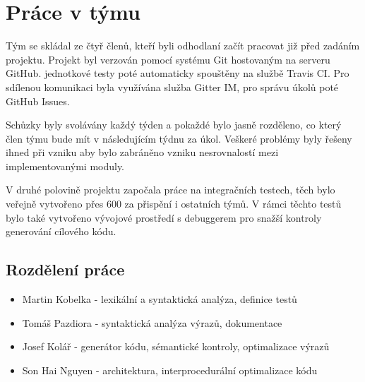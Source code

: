 \section{Práce v týmu}
Tým se skládal ze čtyř členů, kteří byli odhodlaní začít
pracovat již před zadáním projektu. Projekt byl verzován pomocí systému Git hostovaným na serveru GitHub. jednotkové testy poté automaticky spouštěny na službě Travis CI. Pro sdílenou komunikaci byla využívána služba Gitter IM, pro správu úkolů poté GitHub Issues.

Schůzky byly svolávány každý týden a pokaždé bylo jasně rozděleno, co který člen týmu bude mít v následujícím týdnu za úkol. Veškeré problémy byly řešeny ihned při vzniku aby bylo zabráněno vzniku nesrovnalostí mezi implementovanými moduly. 

V druhé polovině projektu započala práce na integračních testech, těch bylo veřejně vytvořeno přes 600 za přispění i ostatních týmů. V rámci těchto testů bylo také vytvořeno vývojové prostředí s debuggerem pro snažší kontroly generování cílového kódu.

\subsection{Rozdělení práce}
\begin{itemize}
    \item Martin Kobelka - lexikální a syntaktická analýza, definice testů
    \item Tomáš Pazdiora - syntaktická analýza výrazů, dokumentace
    \item Josef Kolář - generátor kódu, sémantické kontroly, optimalizace výrazů
    \item Son Hai Nguyen - architektura, interprocedurální optimalizace kódu
\end{itemize}